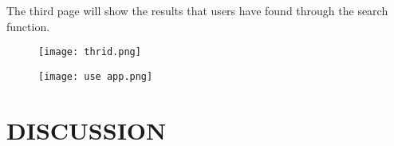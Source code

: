 \documentclass[conference]{IEEEtran}
\begin{document}
    The third page will show the results that users have found through the search function.
    
    \begin{figure}[h]
        \begin{center}
        \centering
        \texttt{[image: thrid.png]}
        \caption{}
        \label{fig:my_label}
        \end{center}
        \end{figure}
       \vspace{1\baselineskip}
        
        \begin{figure}[h]
        \begin{center}
        \centering
        \texttt{[image: use app.png]}
        \caption{}
        \label{fig:my_label}
        \end{center}
        \end{figure}
        
\section{DISCUSSION}
\end{document}
